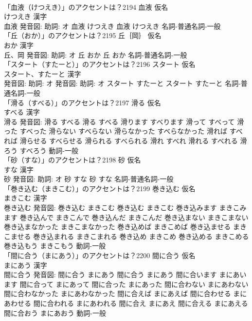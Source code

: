 \documentclass[8pt]{extreport}
\begin{document}
\begin{CJK}{UTF8}{min}
\\	「血液（けつえき）」のアクセントは？2194	血液 仮名　
\\	けつえき 漢字　
\\	血液 発音図: 助詞: オ	血液 けつえき		血液 けつえき				名詞-普通名詞-一般 
\\	「丘（おか）」のアクセントは？2195	丘｛岡｝ 仮名　
\\	おか 漢字　
\\	丘、岡 発音図: 助詞: オ	丘 おか		丘 おか				名詞-普通名詞-一般 
\\	「スタート（すたーと）」のアクセントは？2196	スタート 仮名　
\\	スタート、すたーと 漢字　
\\	発音図: 助詞: オ 発音図: 助詞: オ	スタート すたーと		スタート すたーと				名詞-普通名詞-一般 
\\	「滑る（すべる）」のアクセントは？2197	滑る 仮名　
\\	すべる 漢字　
\\	滑る 発音図:	滑る すべる		滑る すべる 滑ります すべります 滑って すべって 滑った すべった 滑らない すべらない 滑らなかった すべらなかった 滑れば すべれば 滑らせる すべらせる 滑られる すべられる 滑れ すべれ 滑れる すべれる 滑ろう すべろう				動詞-一般 
\\	「砂（すな）」のアクセントは？2198	砂 仮名　
\\	すな 漢字　
\\	砂 発音図: 助詞: オ	砂 すな		砂 すな				名詞-普通名詞-一般 
\\	「巻き込む（まきこむ）」のアクセントは？2199	巻き込む 仮名　
\\	まきこむ 漢字　
\\	巻き込む 発音図:	巻き込む まきこむ		巻き込む まきこむ 巻き込みます まきこみます 巻き込んで まきこんで 巻き込んだ まきこんだ 巻き込まない まきこまない 巻き込まなかった まきこまなかった 巻き込めば まきこめば 巻き込ませる まきこませる 巻き込まれる まきこまれる 巻き込め まきこめ 巻き込める まきこめる 巻き込もう まきこもう				動詞-一般 
\\	「間に合う（まにあう）」のアクセントは？2200	間に合う 仮名　
\\	まにあう 漢字　
\\	間に合う 発音図:	間に合う まにあう		間に合う まにあう 間に合います まにあいます 間に合って まにあって 間に合った まにあった 間に合わない まにあわない 間に合わなかった まにあわなかった 間に合えば まにあえば 間に合わせる まにあわせる 間に合われる まにあわれる 間に合え まにあえ 間に合える まにあえる 間に合おう まにあおう				動詞-一般 

\end{CJK}
\end{document}
